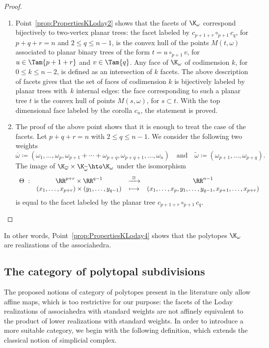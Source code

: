 \begin{proof}
\begin{enumerate}
\item Point~\eqref{prop:PropertiesKLoday2} shows that the facets of $\K_\omega$ correspond bijectively to two-vertex planar trees: the facet labeled by
$c_{p+1+r}\circ_{p+1} c_q$, for $p+q+r=n$ and $2\leq q \leq n-1$, is the convex hull of the points $M(t, \omega)$ associated to planar binary trees of the form $t=u\circ_{p+1} v$, for $u\in\Tam{p+1+r}$ and $v\in \Tam{q}$.
Any face of $\K_\omega$ of codimension $k$, for
$0\leq k \leq n-2$, is defined as an intersection of $k$ facets. The above description of facets gives that the set of faces of codimension $k$ is bijectively labeled by planar trees with~$k$ internal edges: the face corresponding to such a planar tree $t$ is the convex hull of points $M(s, \omega)$, for $s\subset t$. With the top dimensional face labeled by the corolla $c_n$, the statement is proved.

\item The proof of the above point shows that it is enough to treat the case of the facets.
Let $p+q+r=n$ with $2\leq q \leq n-1$. We consider the following two weights
\[
\overline{\omega}\coloneqq (\omega_1, \ldots, \omega_{p}, \omega_{p+1}+\cdots+\omega_{p+q}, \omega_{p+q+1}, \ldots, \omega_{n})
\quad \text{and} \quad
\widetilde{\omega}\coloneqq (\omega_{p+1}, \ldots, \omega_{p+q}).
\]
The image of $\K_{\overline{\omega}}\times \K_{\widetilde{\omega}}\hto \K_\omega$ under the isomorphism
\begin{align*}
\begin{array}{rccc}
\Theta\ : & \RR^{p+r}\times \RR^{q-1} &\xrightarrow{~\cong~} &\RR^{n-1}\\
&(x_1, \ldots, x_{p+r})\times (y_1, \ldots, y_{q-1}) & \longmapsto&
(x_1, \ldots, x_{p}, y_1, \ldots, y_{q-1}, x_{p+1}, \ldots, x_{p+r})
\end{array}
\end{align*}
is equal to the facet labeled by the planar tree $c_{p+1+r}\circ_{p+1} c_q$.\qedhere
\end{enumerate}
\end{proof}

In other words, Point~\eqref{prop:PropertiesKLoday4} shows that the polytopes $\K_\omega$ are realizations of the associahedra.

\subsection{The category of polytopal subdivisions}
The proposed notions of category of polytopes present in the literature only allow affine maps, which is too restrictive for our purpose: the facets of the Loday realizations of associahedra with standard weights are not affinely equivalent to the product of lower realizations with standard weights. In order to introduce a more suitable category, we begin with the following definition, which extends the classical notion of simplicial complex.

